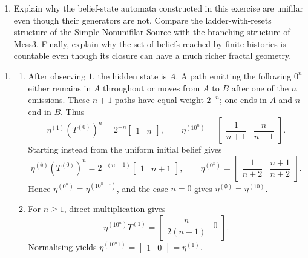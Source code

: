 \documentclass[11pt]{article}
\begin{document}
\begin{exercise}
\begin{enumerate}
\begin{enumerate}
        \item Explain why the belief-state automata constructed in this
          exercise are unifilar even though their generators are not. Compare
          the ladder-with-resets structure of the Simple Nonunifilar Source
          with the branching structure of Mess3. Finally, explain why the set
          of beliefs reached by finite histories is countable even though its
          closure can have a much richer fractal geometry.
      \end{enumerate}
  \end{enumerate}
\end{exercise}
\begin{solution}[ex:p3-3]
    \begin{enumerate}
      \item
        \begin{enumerate}
          \item After observing $1$, the hidden state is $A$. A path emitting
            the following $0^n$ either remains in $A$ throughout or moves from
            $A$ to $B$ after one of the $n$ emissions. These $n+1$ paths have
            equal weight $2^{-n}$; one ends in $A$ and $n$ end in $B$. Thus
            \[
              \eta^{(1)}(T^{(0)})^n
                =2^{-n}\begin{bmatrix}1&n\end{bmatrix},
              \qquad
              \eta^{(10^n)}=
                \begin{bmatrix}\dfrac1{n+1}&\dfrac n{n+1}\end{bmatrix}.
            \]
            Starting instead from the uniform initial belief gives
            \[
              \eta^{(\emptyset)}(T^{(0)})^n
                =2^{-(n+1)}\begin{bmatrix}1&n+1\end{bmatrix},
              \qquad
              \eta^{(0^n)}=
                \begin{bmatrix}\dfrac1{n+2}&\dfrac{n+1}{n+2}\end{bmatrix}.
            \]
            Hence $\eta^{(0^n)}=\eta^{(10^{n+1})}$, and the case $n=0$
            gives $\eta^{(\emptyset)}=\eta^{(10)}$.

          \item For $n\geq1$, direct multiplication gives
            \[
              \eta^{(10^n)}T^{(1)}
                =\begin{bmatrix}\dfrac n{2(n+1)}&0\end{bmatrix}.
            \]
            Normalising yields
            $\eta^{(10^n1)}=\begin{bmatrix}1&0\end{bmatrix}=\eta^{(1)}$.


\end{enumerate}
\end{enumerate}
\end{solution}
\end{document}
